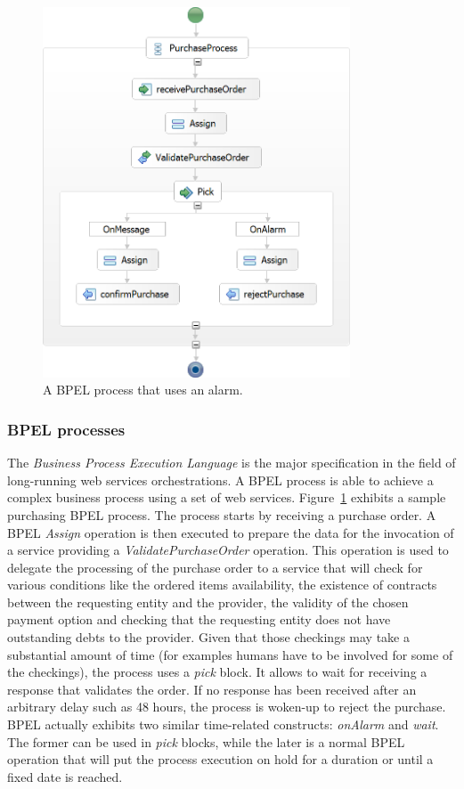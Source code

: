 \begin{figure}[htbp]
    \centering
    \includegraphics[height=11cm]{content/protocol-model/bpel-purchase}
    \caption{A BPEL process that uses an alarm.}
    \label{fig:bpel-purchase}
\end{figure}

\subsubsection{BPEL processes}

The \emph{Business Process Execution Language} \cite{WSBPEL2} is the major specification in the field of long-running web services orchestrations. A BPEL process is able to achieve a complex business process using a set of web services. Figure~\ref{fig:bpel-purchase} exhibits a sample purchasing BPEL process. The process starts by receiving a purchase order. A BPEL \emph{Assign} operation is then executed to prepare the data for the invocation of a service providing a \emph{ValidatePurchaseOrder} operation. This operation is used to delegate the processing of the purchase order to a service that will check for various conditions like the ordered items availability, the existence of contracts between the requesting entity and the provider, the validity of the chosen payment option and checking that the requesting entity does not have outstanding debts to the provider. Given that those checkings may take a substantial amount of time (for examples humans have to be involved for some of the checkings), the process uses a \emph{pick} block. It allows to wait for receiving a response that validates the order. If no response has been received after an arbitrary delay such as 48 hours, the process is woken-up to reject the purchase. BPEL actually exhibits two similar time-related constructs: \emph{onAlarm} and \emph{wait}. The former can be used in \emph{pick} blocks, while the later is a normal BPEL operation that will put the process execution on hold for a duration or until a fixed date is reached.

